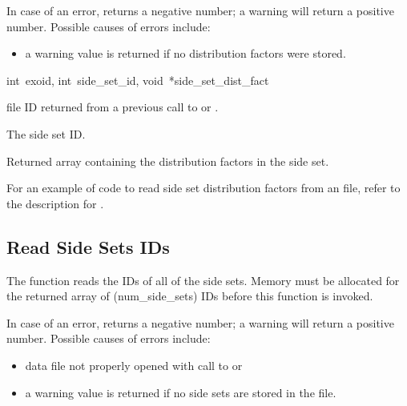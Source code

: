 In case of an error,  returns a
negative number; a warning will return a positive number. Possible
causes of errors include:

\begin{itemize}
 \item a warning value is returned if no distribution factors 
were stored.
\end{itemize}

{int~exoid, 
int~side_set_id, 
void~*side_set_dist_fact}

\begin{parameters}
\item[{int exoid \R{}}]
\exo{} file ID returned from a previous call to  
or .

\item[{int side_set_id \R{}}]
The side set ID.

\item[{void* side_set_dist_fact \W{}}]
Returned array containing the distribution factors in the 
side set.
\end{parameters}

For an example of code to read side set distribution factors from an
\exo{} file, refer to the description for
.




\subsection{Read Side Sets IDs }

The function  reads the IDs of all of
the side sets. Memory must be allocated for the returned array of
({num_side_sets}) IDs before this function is invoked.

In case of an error,  returns a
negative number; a warning will return a positive number. Possible
causes of errors include:

\begin{itemize}
 \item data file not properly opened with call to 
 or 

 \item a warning value is returned if no side sets are stored 
in the file.
\end{itemize}



